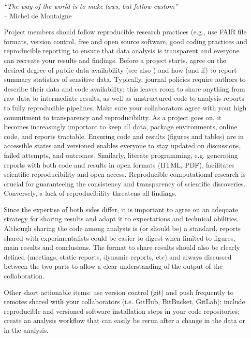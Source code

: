 \documentclass{article}
\begin{document}
\begin{flushright}
\rightskip=1cm\textit{``The way of the world is to make laws, but follow custom''} \\
\vspace{.2em}
\rightskip=0cm -- Michel de Montaigne
\end{flushright}

Project members should follow reproducible research practices (e.g., use FAIR file formats, version control, free and open source software, good coding practices and reproducible reporting \cite{wilkinson2016fair,sandve2013ten,stawarczyk2023establishing} to ensure that data analysis is transparent and everyone can recreate your results and findings. Before a project starts, agree on the desired degree of public data availability (see also ) and how (and if) to report summary statistics of sensitive data. Typically, journal policies require authors to describe their data and code availability; this leaves room to share anything from raw data to intermediate results, as well as unstructured code to analysis reports to fully reproducible pipelines. Make sure your collaborators agree with your high commitment to transparency and reproducibility. As a project goes on, it becomes increasingly important to keep all data, package environments, online code, and reports tractable. Ensuring code and results (figures and tables) are in accessible states and versioned enables everyone to stay updated on discussions, failed attempts, and outcomes. Similarly, literate programming\cite{knuth1984literate}, e.g. generating reports with both code and results in open formats (HTML, PDF), facilitates scientific reproducibility and open access. Reproducible computational research is crucial for guaranteeing the consistency and transparency of scientific discoveries. Conversely, a lack of reproducibility threatens all findings.

Since the expertise of both sides differ, it is important to agree on an adequate strategy for sharing results and adapt it to expectations and technical abilities. Although sharing the code among analysts is (or should be) a standard, reports shared with experimentalists could be easier to digest when limited to figures, main results and conclusions. The format to share results should also be clearly defined (meetings, static reports, dynamic reports, etc) and always discussed between the two parts to allow a clear understanding of the output of the collaboration.   

Other short actionable items: use version control (git) and push frequently to remotes shared with your collaborators (i.e. GitHub, BitBucket, GitLab); include reproducible and versioned software installation steps in your code repositories; create an analysis workflow that can easily be rerun after a change in the data or in the analysis.
\end{document}
